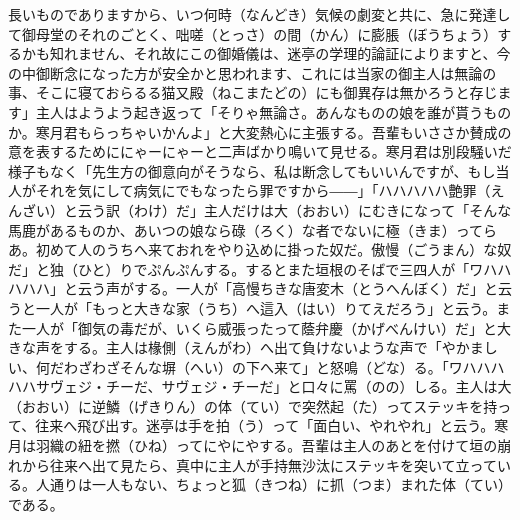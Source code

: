 \documentclass{book}
\begin{document}
長いものでありますから、いつ何時（なんどき）気候の劇変と共に、急に発達して御母堂のそれのごとく、咄嗟（とっさ）の間（かん）に膨脹（ぼうちょう）するかも知れません、それ故にこの御婚儀は、迷亭の学理的論証によりますと、今の中御断念になった方が安全かと思われます、これには当家の御主人は無論の事、そこに寝ておらるる猫又殿（ねこまたどの）にも御異存は無かろうと存じます」主人はようよう起き返って「そりゃ無論さ。あんなものの娘を誰が貰うものか。寒月君もらっちゃいかんよ」と大変熱心に主張する。吾輩もいささか賛成の意を表するためににゃーにゃーと二声ばかり鳴いて見せる。寒月君は別段騒いだ様子もなく「先生方の御意向がそうなら、私は断念してもいいんですが、もし当人がそれを気にして病気にでもなったら罪ですから――」「ハハハハハ艶罪（えんざい）と云う訳（わけ）だ」主人だけは大（おおい）にむきになって「そんな馬鹿があるものか、あいつの娘なら碌（ろく）な者でないに極（きま）ってらあ。初めて人のうちへ来ておれをやり込めに掛った奴だ。傲慢（ごうまん）な奴だ」と独（ひと）りでぷんぷんする。するとまた垣根のそばで三四人が「ワハハハハハ」と云う声がする。一人が「高慢ちきな唐変木（とうへんぼく）だ」と云うと一人が「もっと大きな家（うち）へ這入（はい）りてえだろう」と云う。また一人が「御気の毒だが、いくら威張ったって蔭弁慶（かげべんけい）だ」と大きな声をする。主人は椽側（えんがわ）へ出て負けないような声で「やかましい、何だわざわざそんな塀（へい）の下へ来て」と怒鳴（どな）る。「ワハハハハハサヴェジ・チーだ、サヴェジ・チーだ」と口々に罵（のの）しる。主人は大（おおい）に逆鱗（げきりん）の体（てい）で突然起（た）ってステッキを持って、往来へ飛び出す。迷亭は手を拍（う）って「面白い、やれやれ」と云う。寒月は羽織の紐を撚（ひね）ってにやにやする。吾輩は主人のあとを付けて垣の崩れから往来へ出て見たら、真中に主人が手持無沙汰にステッキを突いて立っている。人通りは一人もない、ちょっと狐（きつね）に抓（つま）まれた体（てい）である。
\end{document}
